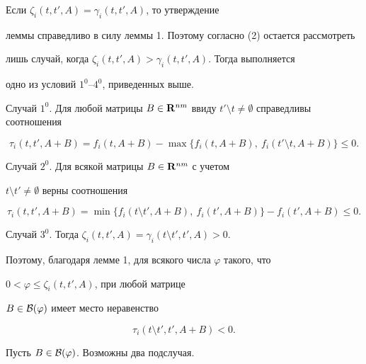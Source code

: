\begin{pf}


Если $\zeta_{i}(t,t',A)=\gamma_{i}(t,t',A)$, то утверждение


леммы справедливо в силу леммы 1. Поэтому согласно (2) остается рассмотреть


лишь случай, когда $\zeta_{i}(t,t',A)>\gamma_{i}(t,t',A)$. Тогда выполняется


одно из условий $1^0$--$4^0$, приведенных выше.





Случай $1^0$. Для любой матрицы $B\in \bold R^{nm}$ ввиду $t'\setminus


t\ne \emptyset$ справедливы соотношения


$$


\tau_{i}(t,t',A+B)=f_i(t,A+B)-\max\{f_i(t,A+B),


\ f_i(t'\setminus t,A+B)\}\le 0.


$$





Случай $2^0$. Для всякой матрицы $B\in \bold R^{nm}$ с учетом


$t\setminus t'\ne \emptyset$ верны соотношения


$$


\tau_{i}(t,t',A+B)=\min\{f_i(t\setminus t',A+B),


\ f_i(t',A+B)\}-f_i(t',A+B)\le 0.


$$





Случай $3^0$. Тогда $\zeta_{i}(t,t',A)=\gamma_{i}(t\setminus t',t',A)>0$.


Поэтому, благодаря лемме 1, для всякого числа $\varphi$ такого, что


$0<\varphi\leq \zeta_{i}(t,t',A)$, при любой матрице


$B\in \cal B(\varphi)$ имеет место неравенство


\begin{equation}


\tau_{i}(t\setminus t',t',A+B)< 0.


\end{equation}





Пусть $B \in \cal B(\varphi)$. Возможны два подслучая.






\end{pf}
